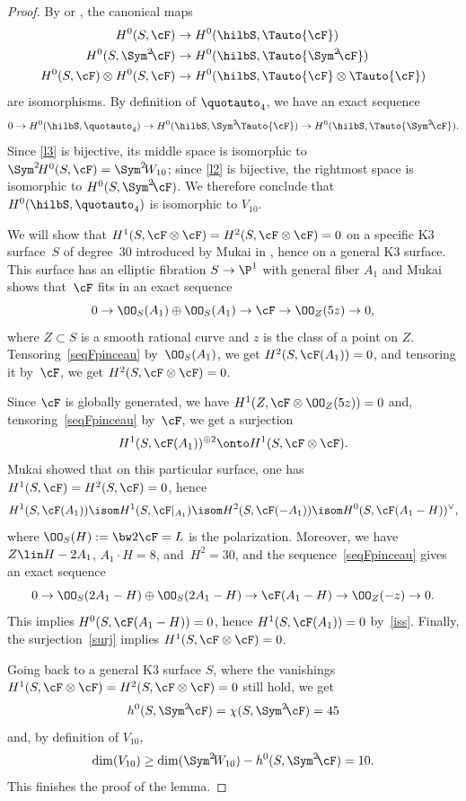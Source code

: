 \begin{proof}
By \cite[Th.\,1]{dan2} or \cite[Th.\,6.6]{krug}, the canonical maps
\begin{align}
H^0(S,\cF)& \to H^0(\hilbS, \Tauto{\cF})\nonumber \\
H^0(S,\Sym^2\! \cF) &\to H^0(\hilbS,\Tauto{\Sym^2 \!\cF})\label{l2}\\
H^0(S,\cF) \otimes H^0(S,\cF)& \to H^0(\hilbS, \Tauto{\cF}\otimes \Tauto{\cF}) \label{l3}
\end{align}
are isomorphisms. By definition of $\quotauto_4$, we have an exact sequence
\[
0\to H^0(\hilbS,\quotauto_4)\to
H^0(\hilbS,\Sym^2\! \Tauto{\cF})\to H^0(\hilbS,\Tauto{\Sym^2\!\cF}).
\]
Since \eqref{l3} is bijective, its middle space is isomorphic to $ \Sym^2\! H^0(S,\cF)=\Sym^2\!W_{10} $; since \eqref{l2} is bijective, the rightmost space is isomorphic to $H^0(S,\Sym^2\!\cF )$. We therefore conclude
that $H^0(\hilbS, \quotauto_4) $ is isomorphic to $ V_{10} $.

We will show
that $H^1(S,\cF\otimes \cF) =H^2(S,\cF\otimes \cF) = 0 $ on a specific K3 surface~$S$ of degree~$30$ introduced by Mukai in \cite[\S6]{mukai2}, hence on a general K3 surface. This surface has an elliptic fibration $S\to\P^1$ with general fiber $A_1$
and Mukai shows that~$\cF$
fits in an exact sequence
\begin{equation}
\label{seqFpinceau}
0 \to \OO_S(A_1) \oplus \OO_S(A_1) \to \cF \to \OO_Z(5z) \to 0,
\end{equation}
where $Z\subset S$ is a smooth rational curve {and $z$ is the class of a point
on $Z$}. Tensoring~\eqref{seqFpinceau} by~$\OO_S(A_1)$, we get $H^2(S,\cF(A_1))=0$, and tensoring it by~$\cF$, we get $H^2(S,\cF\otimes \cF) =0$.

Since $\cF$ is globally generated, we have $H^1(Z,\cF\otimes \OO_Z(5z))=0$ and, tensoring~\eqref{seqFpinceau} by~$\cF$, we get a surjection
\begin{equation}
\label{surj}
H^1(S,\cF(A_1))^{\oplus 2}\onto H^1(S,\cF\otimes \cF).
\end{equation}
Mukai showed that on this particular surface, one has $H^1(S,\cF)=H^2(S,\cF)=0$, hence
\begin{equation}
\label{iss}
H^1(S,\cF(A_1))\isom H^1(S,\cF\vert_{A_1})\isom H^2(S,\cF(-A_1))\isom H^0(S,\cF(A_1-H))^\vee,
\end{equation}
where $\OO_S(H) := \bw2\cF=L$ is the polarization. Moreover, we have $Z\lin H-2A_1$, $A_1 \cdot H =
8$, and~$H^2=30$, and the sequence~\eqref{seqFpinceau} gives an exact sequence
\[
0 \to \OO_S(2A_1-H) \oplus \OO_S(2A_1-H) \to \cF(A_1-H) \to \OO_Z(-z) \to 0.
\]
This implies $H^0(S,\cF(A_1-H))=0$, hence $ H^1(S,\cF(A_1))=0$ by~\eqref{iss}. Finally, the surjection~\eqref{surj} implies
$H^1(S,\cF\otimes \cF) =0$.

Going back to a general K3 surface $S$, where the vanishings $H^1(S,\cF\otimes \cF) =H^2(S,\cF\otimes \cF) =0$ still hold, we get
\[
h^0(S,\Sym^2\!\cF)= \chi(S,\Sym^2\!\cF)= 45
\] and, by definition of $V_{10}$,
\[
\dim (V_{10}) \ge\dim(\Sym^2\!W_{10})
-h^0(S,\Sym^2\!\cF)=10.
\]
This finishes the proof of the lemma.
\end{proof}


